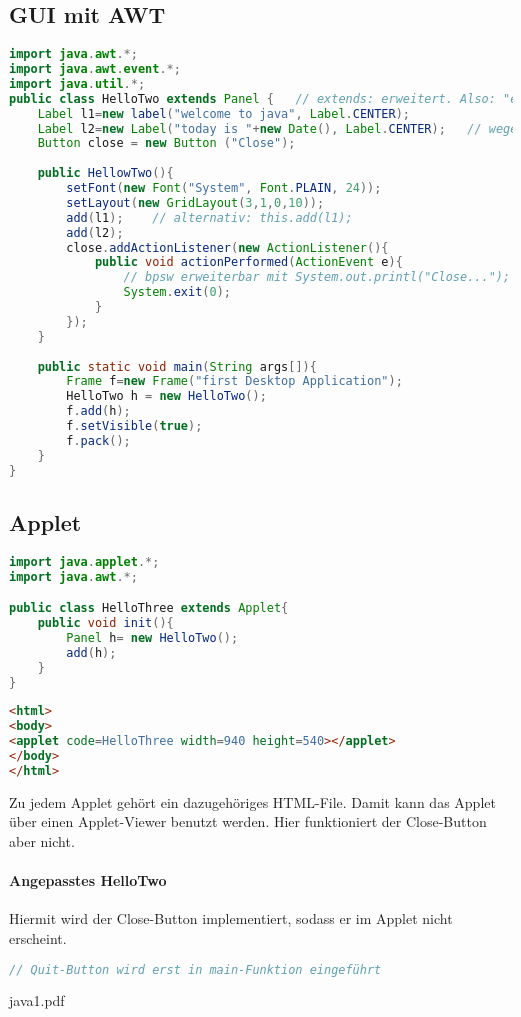 \subsection{GUI mit AWT}
\begin{lstlisting}[language=Java]
import java.awt.*;
import java.awt.event.*;
import java.util.*;
public class HelloTwo extends Panel {	// extends: erweitert. Also: "erbt von"
	Label l1=new label("welcome to java", Label.CENTER);
	Label l2=new Label("today is "+new Date(), Label.CENTER);	// wegen import javo.util.* kann hier nur Date() geschrieben werden.
	Button close = new Button ("Close");
	
	public HellowTwo(){
		setFont(new Font("System", Font.PLAIN, 24));
		setLayout(new GridLayout(3,1,0,10));
		add(l1);	// alternativ: this.add(l1);
		add(l2);
		close.addActionListener(new ActionListener(){
			public void actionPerformed(ActionEvent e){
				// bpsw erweiterbar mit System.out.printl("Close...");
				System.exit(0);
			}
		});
	}
	
	public static void main(String args[]){
		Frame f=new Frame("first Desktop Application");
		HelloTwo h = new HelloTwo();
		f.add(h);
		f.setVisible(true);
		f.pack();
	}
}
\end{lstlisting}

\subsection{Applet}
\begin{lstlisting}[language=Java]
import java.applet.*;
import java.awt.*;

public class HelloThree extends Applet{
	public void init(){
		Panel h= new HelloTwo();
		add(h);
	}
}
\end{lstlisting}
\begin{lstlisting}[language=HTML]
<html>
<body>
<applet code=HelloThree width=940 height=540></applet>
</body>
</html>
\end{lstlisting}
Zu jedem Applet gehört ein dazugehöriges HTML-File. Damit kann das Applet über einen Applet-Viewer benutzt werden. Hier funktioniert der Close-Button aber nicht. 
\paragraph{Angepasstes HelloTwo} Hiermit wird der Close-Button implementiert, sodass er im Applet nicht erscheint.
\begin{lstlisting}[language=Java]
// Quit-Button wird erst in main-Funktion eingeführt
\end{lstlisting}
java1.pdf
